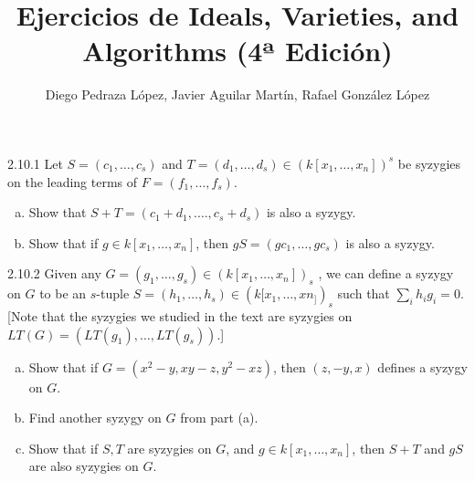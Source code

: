 \documentclass[twoside]{article}
\begin{document}
\title{Ejercicios de Ideals, Varieties, and Algorithms (4ª Edición)}
\author{Diego Pedraza López, Javier Aguilar Martín, Rafael González López}
\maketitle

\begin{ejercicio}{2.10.1}
Let $S = (c_1, \dots , c_s)$ and $T = (d_1, \dots , d_s) ∈ (k[x_1, \dots , x_n])^s$ be syzygies on the leading
terms of $F = (f_1, \dots , f_s)$.
\begin{enumerate}[a.]
\item Show that $S + T = (c_1 + d_1, . \dots , c_s + d_s)$ is also a syzygy.
\item Show that if $g ∈ k[x_1,\dots , x_n]$, then $g  S = (gc_1, \dots , gc_s)$ is also a syzygy.
\end{enumerate}
\end{ejercicio}

\begin{solucion}

\end{solucion}

\newpage

\begin{ejercicio}{2.10.2}
Given any $G = (g_1, \dots , g_s) ∈ (k[x_1, \dots , x_n])_s$ , we can define a syzygy on $G$ to be an $s$-tuple
$S = (h_1,\dots , h_s) ∈ (k[x_1, \dots , xn_])_s$ such that
$\sum_i h_ig_i = 0$. [Note that the syzygies
we studied in the text are syzygies on $LT(G) = (LT(g_1), \dots , LT(g_s))$.]
\begin{enumerate}[a.]
\item Show that if $G = (x^2 − y, xy − z, y^2 − xz)$, then $(z,−y, x)$ defines a syzygy on $G$.
\item Find another syzygy on $G$ from part (a).
\item Show that if $S, T$ are syzygies on $G$, and $g ∈ k[x_1,\dots , x_n]$, then $S+T$ and $gS$ are also
syzygies on $G$.

\end{enumerate}
\end{ejercicio}
\begin{solucion}

\end{solucion}
\newpage
\end{document}
